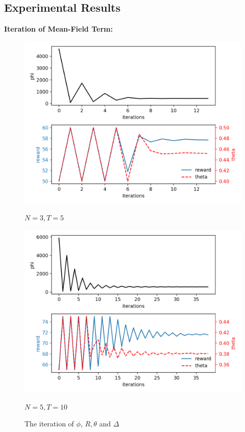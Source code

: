 \documentclass{article}
\theoremstyle{plain}
\theoremstyle{definition}
\theoremstyle{remark}
\begin{document}
\subsection{Experimental Results}
\textbf{Iteration of Mean-Field Term: }
\begin{figure}
	\begin{minipage}{0.49\linewidth}
		\vspace{3pt}
		\centerline{\includegraphics[width=\textwidth]{figures/figure_38.png}}
		\centerline{$N=3, T=5$}
	\end{minipage}
	\begin{minipage}{0.49\linewidth}
		\vspace{3pt}
		\centerline{\includegraphics[width=\textwidth]{figures/figure_39.png}}
		\centerline{$N=5, T=10$}
	\end{minipage}
	\caption{The iteration of $\phi$, $R, \theta$ and $\Delta$}
\end{figure}
\end{document}
